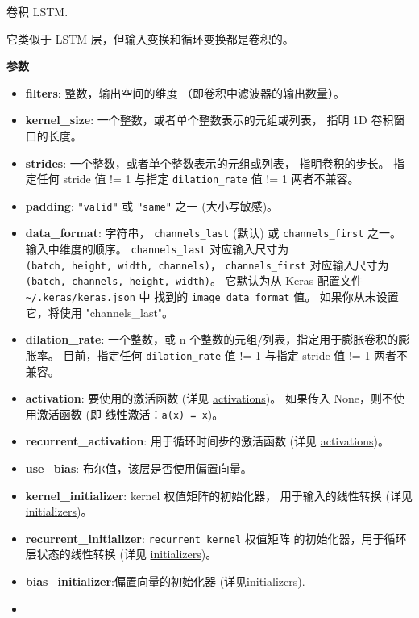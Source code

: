 卷积 LSTM.

它类似于 LSTM 层，但输入变换和循环变换都是卷积的。

\textbf{参数}

\begin{itemize}
\tightlist
\item
  \textbf{filters}: 整数，输出空间的维度 （即卷积中滤波器的输出数量）。
\item
  \textbf{kernel\_size}: 一个整数，或者单个整数表示的元组或列表， 指明
  1D 卷积窗口的长度。
\item
  \textbf{strides}: 一个整数，或者单个整数表示的元组或列表，
  指明卷积的步长。 指定任何 stride 值 != 1 与指定
  \texttt{dilation\_rate} 值 != 1 两者不兼容。
\item
  \textbf{padding}: \texttt{"valid"} 或 \texttt{"same"} 之一
  (大小写敏感)。
\item
  \textbf{data\_format}: 字符串， \texttt{channels\_last} (默认) 或
  \texttt{channels\_first} 之一。 输入中维度的顺序。
  \texttt{channels\_last} 对应输入尺寸为
  \texttt{(batch,\ height,\ width,\ channels)}，
  \texttt{channels\_first} 对应输入尺寸为
  \texttt{(batch,\ channels,\ height,\ width)}。 它默认为从 Keras
  配置文件 \texttt{\textasciitilde{}/.keras/keras.json} 中 找到的
  \texttt{image\_data\_format} 值。 如果你从未设置它，将使用
  "channels\_last"。
\item
  \textbf{dilation\_rate}: 一个整数，或 n
  个整数的元组/列表，指定用于膨胀卷积的膨胀率。 目前，指定任何
  \texttt{dilation\_rate} 值 != 1 与指定 stride 值 != 1 两者不兼容。
\item
  \textbf{activation}: 要使用的激活函数 (详见
  \hyperref[activations]{activations})。 如果传入
  None，则不使用激活函数 (即 线性激活：\texttt{a(x)\ =\ x})。
\item
  \textbf{recurrent\_activation}: 用于循环时间步的激活函数 (详见
  \hyperref[activations]{activations})。
\item
  \textbf{use\_bias}: 布尔值，该层是否使用偏置向量。
\item
  \textbf{kernel\_initializer}: kernel 权值矩阵的初始化器，
  用于输入的线性转换 (详见 \hyperref[initializers]{initializers})。
\item
  \textbf{recurrent\_initializer}: \texttt{recurrent\_kernel} 权值矩阵
  的初始化器，用于循环层状态的线性转换 (详见
  \hyperref[initializers]{initializers})。
\item
  \textbf{bias\_initializer}:偏置向量的初始化器
  (详见\hyperref[initializers]{initializers}).
\item

\end{itemize}
